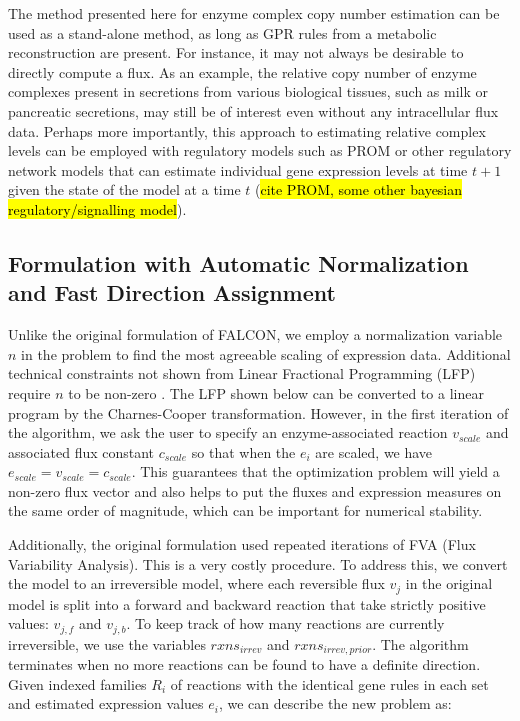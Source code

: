 The method presented here for enzyme complex copy number estimation
can be used as a stand-alone method, as long as GPR rules from a
metabolic reconstruction are present. For instance, it may not always
be desirable to directly compute a flux. As an example, the relative
copy number of enzyme complexes present in secretions from various
biological tissues, such as milk or pancreatic secretions, may still
be of interest even without any intracellular flux data.  Perhaps more
importantly, this approach to estimating relative complex levels can
be employed with regulatory models such as PROM or other regulatory
network models that can estimate individual gene expression levels at
time $t+1$ given the state of the model at a time $t$ (\hl{cite PROM,
some other bayesian regulatory/signalling model}).

\subsection{Formulation with Automatic Normalization and Fast Direction Assignment}
Unlike the original formulation of FALCON, we employ a normalization variable $n$ in the problem
to find the most agreeable scaling of expression data. Additional technical constraints not shown
from Linear Fractional Programming (LFP) require $n$ to be non-zero \cite{Boyd2004}. The
LFP shown below can be converted to a linear program by the Charnes-Cooper transformation.
However, in the first iteration of the algorithm, we ask the user to
specify an enzyme-associated reaction $v_{scale}$ and associated flux
constant $c_{scale}$ so that when the $e_i$ are scaled, we have
$e_{scale} = v_{scale} = c_{scale}$. This guarantees that the
optimization problem will yield a non-zero flux vector and also helps
to put the fluxes and expression measures on the same order of
magnitude, which can be important for numerical stability.

Additionally, the original formulation
used repeated iterations of FVA (Flux Variability Analysis). This is a very costly procedure. 
To address this, we convert the model to an irreversible model, where each reversible flux $v_j$
in the original model is split into a forward and backward reaction that take strictly positive
values: $v_{j,f}$ and $v_{j,b}$. To keep track of how many reactions
are currently irreversible, we use the variables $rxns_{irrev}$ and
$rxns_{irrev,prior}$. The algorithm terminates when no more reactions
can be found to have a definite direction.  Given indexed families
$R_i$ of reactions with the identical gene rules in each set and
estimated expression values $e_i$, we can describe the new problem as:


